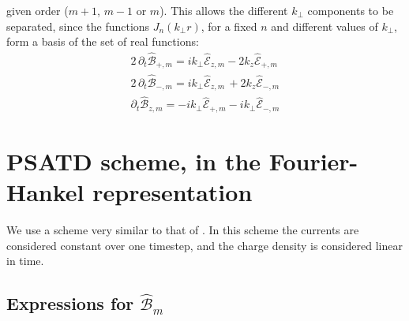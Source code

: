 \documentclass[1p,times]{elsarticle}
\newcommand{\spectral}[1]{\hat{\mathcal{#1}}}
\begin{document}
given order ($m+1$, $m-1$ or $m$). This allows the
different $k_\perp $ components to be separated, since the functions $J_n(k_\perp r)$, for a
fixed $n$ and different values of $k_\perp $, form a basis of the set of real functions:
\begin{subequations}
\begin{align}
2 \,\partial_t \spectral{B}_{+,m} =
ik_\perp \spectral{E}_{z,m} -2 k_z\spectral{E}_{+,m} \\
2\, \partial_t \spectral{B}_{-,m} = ik_\perp \spectral{E}_{z,m} \,
    + 2k_z\spectral{E}_{-,m} \\
 \partial_t \spectral{B}_{z,m} = -ik_\perp \spectral{E}_{+,m}  - ik_\perp \spectral{E}_{-,m}
\end{align}
\end{subequations}

\section{PSATD scheme, in the Fourier-Hankel representation}
\label{sec:PSATDderiv}

We use a scheme very similar to that of \cite{Haber}. In this scheme the currents are considered constant over one timestep, and the charge density is considered linear in time.

\subsection{Expressions for $\spectral{B}_m$}
\end{document}
